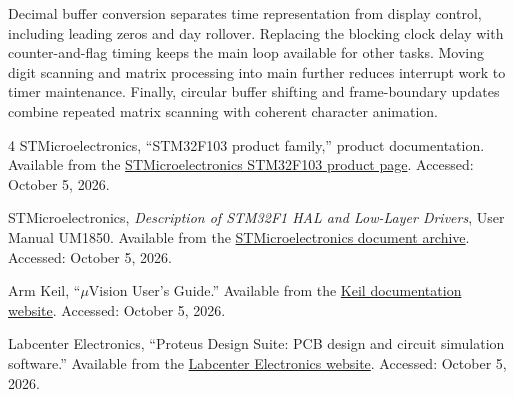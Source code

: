 \documentclass[a4paper]{article}
\begin{document}
Decimal buffer conversion separates time representation from display control,
including leading zeros and day rollover. Replacing the blocking clock delay
with counter-and-flag timing keeps the main loop available for other tasks.
Moving digit scanning and matrix processing into main further reduces interrupt
work to timer maintenance. Finally, circular buffer shifting and frame-boundary
updates combine repeated matrix scanning with coherent character animation.
\clearpage
{}
{}
\begin{thebibliography}{4}
STMicroelectronics, ``STM32F103 product family,'' product documentation.
Available from the
\href{https://www.st.com/en/microcontrollers-microprocessors/stm32f103.html}
{STMicroelectronics STM32F103 product page}.
Accessed: October 5, 2026.

STMicroelectronics, \emph{Description of STM32F1 HAL and Low-Layer Drivers},
User Manual UM1850. Available from the
\href{https://www.st.com/resource/en/user_manual/um1850-description-of-stm32f1-hal-and-lowlayer-drivers-stmicroelectronics.pdf}
{STMicroelectronics document archive}.
Accessed: October 5, 2026.

Arm Keil, ``\mbox{$\mu$Vision} User's Guide.'' Available from the
\href{https://www.keil.com/support/man/docs/uv4/default.htm}
{Keil documentation website}.
Accessed: October 5, 2026.

Labcenter Electronics, ``Proteus Design Suite: PCB design and circuit simulation
software.'' Available from the
\href{https://www.labcenter.com/}{Labcenter Electronics website}.
Accessed: October 5, 2026.
\end{thebibliography}
\end{document}
